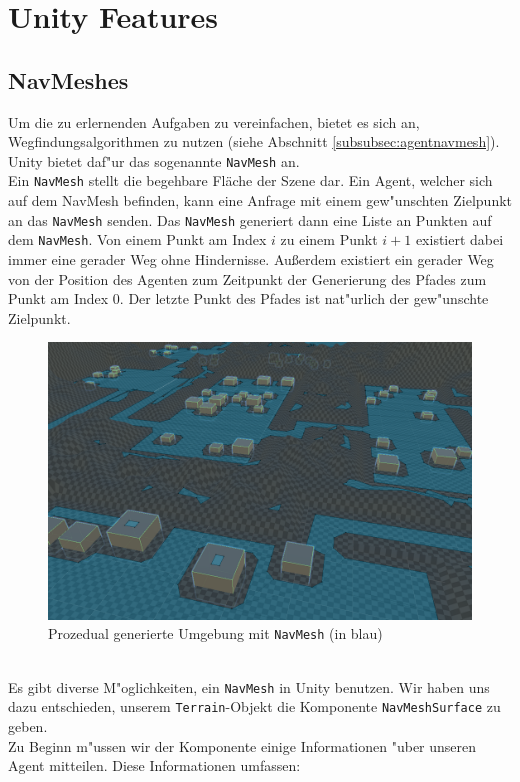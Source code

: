 \section{Unity Features}

\subsection{NavMeshes}

Um die zu erlernenden Aufgaben zu vereinfachen, bietet es sich an, Wegfindungsalgorithmen zu nutzen (siehe Abschnitt \ref{subsubsec:agentnavmesh}). Unity bietet daf"ur das sogenannte \texttt{NavMesh} an.
\\
Ein \texttt{NavMesh} stellt die begehbare Fläche der Szene dar. Ein Agent, welcher sich auf dem NavMesh befinden, kann eine Anfrage mit einem gew"unschten Zielpunkt an das \texttt{NavMesh} senden. Das \texttt{NavMesh} generiert dann eine Liste an Punkten auf dem \texttt{NavMesh}. Von einem Punkt am Index $i$ zu einem Punkt $i+1$ existiert dabei immer eine gerader Weg ohne Hindernisse. Außerdem existiert ein gerader Weg von der Position des Agenten zum Zeitpunkt der Generierung des Pfades zum Punkt am Index $0$. Der letzte Punkt des Pfades ist nat"urlich der gew"unschte Zielpunkt.
\begin{figure}
	\centering
	\includegraphics[width=0.8\linewidth]{resources/img/navMesh01.png}
	\caption{Prozedual generierte Umgebung mit \texttt{NavMesh} (in blau)}
	\label{fig:navMesh01}
\end{figure}
\\
Es gibt diverse M"oglichkeiten, ein \texttt{NavMesh} in Unity benutzen. Wir haben uns dazu entschieden, unserem \texttt{Terrain}-Objekt die Komponente \texttt{NavMeshSurface} zu geben.
\\
Zu Beginn m"ussen wir der Komponente einige Informationen "uber unseren Agent mitteilen. Diese Informationen umfassen:
